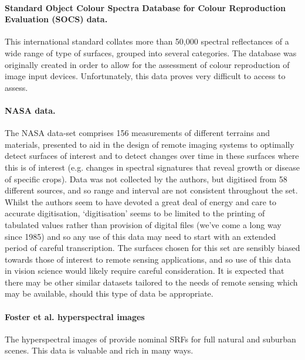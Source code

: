 \paragraph{Standard Object Colour Spectra Database for Colour Reproduction Evaluation (SOCS) data.}
This international standard \citep{tajima_development_1998,iso/tc_130_graphic_technology_iso/tr_2003} collates more than 50,000 spectral reflectances of a wide range of type of surfaces, grouped into several categories. The database was originally created in order to allow for the assessment of colour reproduction of image input devices. Unfortunately, this data proves very difficult to access to assess.

\paragraph{NASA data.}
The NASA data-set \citep{david_e._bowker_spectral_1985} comprises 156 measurements of different terrains and materials, presented to aid in the design of remote imaging systems to optimally detect surfaces of interest and to detect changes over time in these surfaces where this is of interest (e.g. changes in spectral signatures that reveal growth or disease of specific crops). Data was not collected by the authors, but digitised from 58 different sources, and so range and interval are not consistent throughout the set. Whilst the authors seem to have devoted a great deal of energy and care to accurate digitisation, `digitisation' seems to be limited to the printing of tabulated values rather than provision of digital files (we've come a long way since 1985) and so any use of this data may need to start with an extended period of careful transcription. The surfaces chosen for this set are sensibly biased towards those of interest to remote sensing applications, and so use of this data in vision science would likely require careful consideration. It is expected that there may be other similar datasets tailored to the needs of remote sensing which may be available, should this type of data be appropriate.

\paragraph{Foster et al. hyperspectral images}
The hyperspectral images of \citet{nascimento_statistics_2002,foster_frequency_2006} provide nominal \glspl{SRF} for full natural and suburban scenes. This data is valuable and rich in many ways. 

